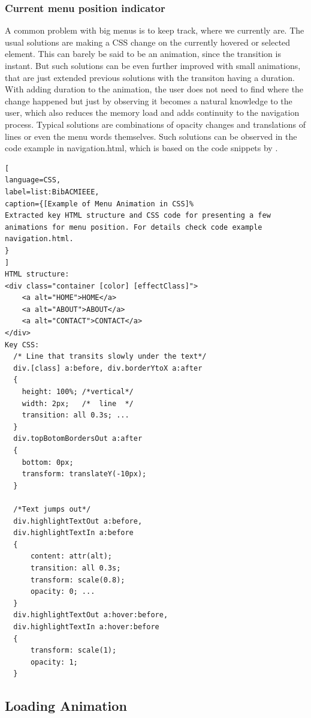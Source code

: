\subsubsection{Current menu position indicator} %
\label{subsub:menu}

A common problem with big menus is to keep track, where we currently are. The usual solutions are making a CSS change on the currently hovered or selected element. This can barely be said to be an animation, since the transition is instant. But such solutions can be even further improved with small animations, that are just extended previous solutions with the transiton having a duration. With adding duration to the animation, the user does not need to find where the change happened but just by observing it becomes a natural knowledge to the user, which also reduces the memory load and adds continuity to the navigation process. Typical solutions are combinations of opacity changes and translations of lines or even the menu words themselves. Such solutions can be observed in the code example in navigation.html, which is based on the code snippets by \citet{menuIndex}.

\begin{lstlisting}[
language=CSS,
label=list:BibACMIEEE,
caption={[Example of Menu Animation in CSS]%
Extracted key HTML structure and CSS code for presenting a few animations for menu position. For details check code example navigation.html.
}
]
HTML structure:
<div class="container [color] [effectClass]">
	<a alt="HOME">HOME</a>
	<a alt="ABOUT">ABOUT</a>
	<a alt="CONTACT">CONTACT</a>
</div>
Key CSS:
  /* Line that transits slowly under the text*/
  div.[class] a:before, div.borderYtoX a:after
  {
    height: 100%; /*vertical*/
    width: 2px;   /*  line  */
    transition: all 0.3s; ...
  }
  div.topBotomBordersOut a:after
  {
    bottom: 0px;
    transform: translateY(-10px);
  }

  /*Text jumps out*/
  div.highlightTextOut a:before,
  div.highlightTextIn a:before
  {
      content: attr(alt);
      transition: all 0.3s;
      transform: scale(0.8);
      opacity: 0; ...
  } 
  div.highlightTextOut a:hover:before,
  div.highlightTextIn a:hover:before
  {
      transform: scale(1);
      opacity: 1;
  }

\end{lstlisting}
\label{list:menu}


\subsection{Loading Animation} %
\label{sub:loadingCSS}

